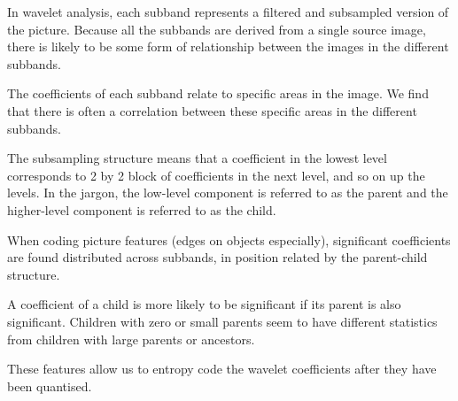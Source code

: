 In wavelet analysis, each subband represents a filtered and subsampled
version of the picture. Because all the subbands are derived from a
single source image, there is likely to be some form of relationship
between the images in the different subbands.

The coefficients of each subband relate to specific areas in the image.
We find that there is often a correlation between these specific areas
in the different subbands.

The subsampling structure means that a coefficient in the lowest level
corresponds to  2 by 2 block of coefficients in the next level, and so
on up the levels. In the jargon, the low-level component is referred to
as the parent and the higher-level component is referred to as the
child.

When coding picture features (edges on objects especially), significant
coefficients are found distributed across subbands, in position related
by the parent-child structure.

A coefficient of a child is more likely to be significant if its parent
is also significant. Children with zero or small parents seem to have
different statistics from children with large parents or ancestors.

These features allow us to entropy code the wavelet coefficients after
they have been quantised.
